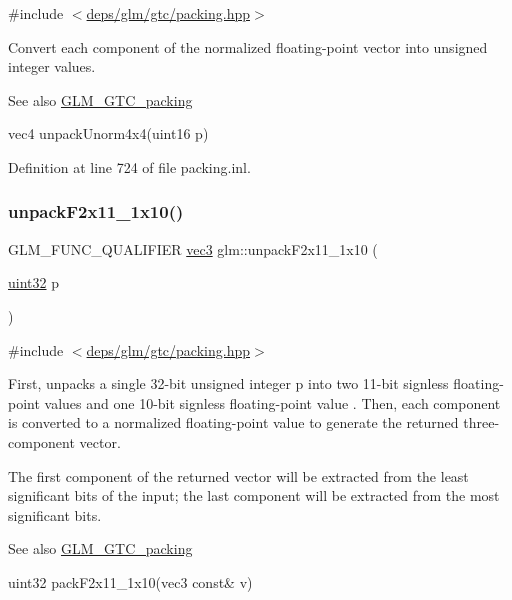 {\ttfamily \#include $<$\hyperlink{gtc_2packing_8hpp}{deps/glm/gtc/packing.\+hpp}$>$}

Convert each component of the normalized floating-\/point vector into unsigned integer values.

\begin{DoxySeeAlso}{See also}
\hyperlink{group__gtc__packing}{G\+L\+M\+\_\+\+G\+T\+C\+\_\+packing} 

vec4 unpack\+Unorm4x4(uint16 p) 
\end{DoxySeeAlso}


Definition at line 724 of file packing.\+inl.

\mbox{\label{group__gtc__packing_ga8b9c7991eb021d95c778bf5c0b2f7824}} 
\subsubsection{\texorpdfstring{unpack\+F2x11\+\_\+1x10()}{unpackF2x11\_1x10()}}
{\footnotesize\ttfamily G\+L\+M\+\_\+\+F\+U\+N\+C\+\_\+\+Q\+U\+A\+L\+I\+F\+I\+ER \hyperlink{group__core__types_ga1c47e8b3386109bc992b6c48e91b0be7}{vec3} glm\+::unpack\+F2x11\+\_\+1x10 (\begin{DoxyParamCaption}\item[{\hyperlink{group__gtc__type__precision_ga202b6a53c105fcb7e531f9b443518451}{uint32}}]{p }\end{DoxyParamCaption})}



{\ttfamily \#include $<$\hyperlink{gtc_2packing_8hpp}{deps/glm/gtc/packing.\+hpp}$>$}

First, unpacks a single 32-\/bit unsigned integer p into two 11-\/bit signless floating-\/point values and one 10-\/bit signless floating-\/point value . Then, each component is converted to a normalized floating-\/point value to generate the returned three-\/component vector.

The first component of the returned vector will be extracted from the least significant bits of the input; the last component will be extracted from the most significant bits.

\begin{DoxySeeAlso}{See also}
\hyperlink{group__gtc__packing}{G\+L\+M\+\_\+\+G\+T\+C\+\_\+packing} 

uint32 pack\+F2x11\+\_\+1x10(vec3 const\& v) 
\end{DoxySeeAlso}


